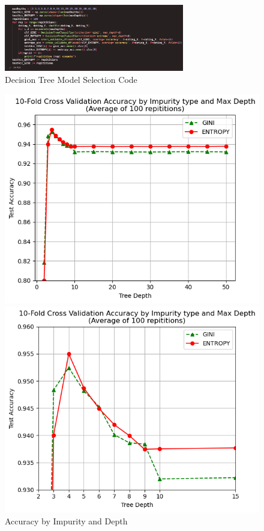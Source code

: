\documentclass{article}
\begin{document}
\begin{figure}[H]
    \centering
    \includegraphics[width=0.7\textwidth]{tree_selection_code.png}
    \caption{Decision Tree Model Selection Code}
\end{figure}

\begin{figure}[H]
    \centering
    \begin{minipage}[b]{0.49\textwidth}
        \centering
        \includegraphics[width=\textwidth]{tree_selection1.png}
        \caption{Accuracy by Impurity and Depth}
    \end{minipage}
    \hfill
    \begin{minipage}[b]{0.49\textwidth}
        \centering
        \includegraphics[width=\textwidth]{tree_selection2.png}

\end{minipage}
\end{figure}
\end{document}
